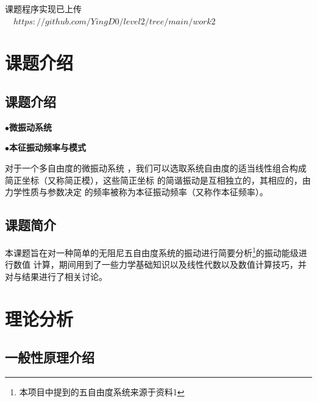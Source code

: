 \documentclass[11pt, a4paper, oneside]{ctexart}
\begin{document}
\vspace{30mm}\begin{center}
    \small{课题程序实现已上传}\small{\\$\quad https://github.com/YingD0/level2/tree/main/work2$}
        
\end{center}

\newpage
{}
\setcounter{page}{1}
\tableofcontents
\newpage
\setcounter{page}{1}

\section{课题介绍}
\subsection{课题介绍}
{
    $\bullet$\textbf{微振动系统}




    \setlength{\parindent}{2em}$\bullet$\textbf{本征振动频率与模式}


    \setlength{\parindent}{3em}对于一个多自由度的微振动系统
    ，我们可以选取系统自由度的适当线性组合构成简正坐标（又称简正模），这些简正坐标
    的简谐振动是互相独立的，其相应的，由力学性质与参数决定
    的频率被称为本征振动频率（又称作本征频率）。

}
\subsection{课题简介}
{本课题旨在对一种简单的无阻尼五自由度系统的振动进行简要分析\footnote{本项目中提到的五自由度系统来源于资料1}的振动能级进行数值
计算，期间用到了一些力学基础知识以及线性代数以及数值计算技巧，并对与结果进行了相关讨论。}
\newpage
\section{理论分析}
\subsection{一般性原理介绍}
\end{document}
